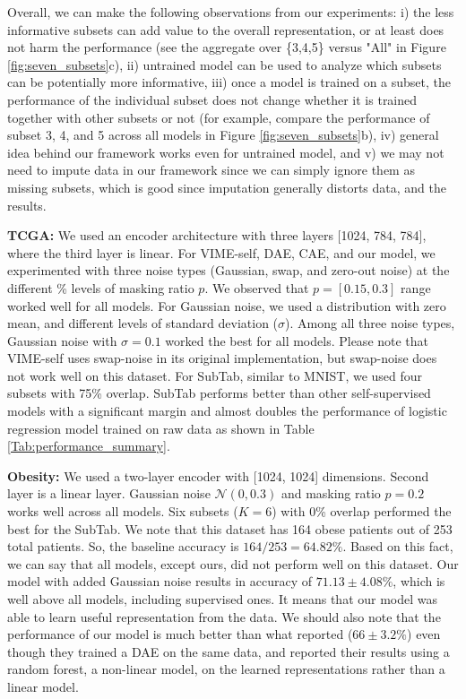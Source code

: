 Overall, we can make the following observations from our experiments: i) the less informative subsets can add value to the overall representation, or at least does not harm the performance (see the aggregate over \{3,4,5\} versus "All" in Figure  \ref{fig:seven_subsets}c), ii) untrained model can be used to analyze which subsets can be potentially more informative, iii) once a model is trained on a subset, the performance of the individual subset does not change whether it is trained together with other subsets or not (for example, compare the performance of subset 3, 4, and 5 across all models in Figure \ref{fig:seven_subsets}b), iv) general idea behind our framework works even for untrained model, and v) we may not need to impute data in our framework since we can simply ignore them as missing subsets, which is good since imputation generally distorts data, and the results.

\textbf{TCGA:}
We used an encoder architecture with three layers [1024, 784, 784], where the third layer is linear. For VIME-self, DAE, CAE, and our model, we experimented with three noise types (Gaussian, swap, and zero-out noise) at the different \% levels of masking ratio $p$. We observed that $p=[0.15,0.3]$ range worked well for all models. For Gaussian noise, we used a distribution with zero mean, and different levels of standard deviation ($\sigma$). Among all three noise types, Gaussian noise with $\sigma=0.1$ worked the best for all models. Please note that VIME-self uses swap-noise in its original implementation, but swap-noise does not work well on this dataset. For SubTab, similar to MNIST, we used four subsets with 75\% overlap. SubTab performs better than other self-supervised models with a significant margin and almost doubles the performance of logistic regression model trained on raw data as shown in Table \ref{Tab:performance_summary}.

\textbf{Obesity:}
We used a two-layer encoder with [1024, 1024] dimensions. Second layer is a linear layer. Gaussian noise $\mathcal{N}(0,0.3)$ and masking ratio $p=0.2$ works well across all models. Six subsets ($K=6$) with 0\% overlap performed the best for the SubTab. We note that this dataset has 164 obese patients out of 253 total patients. So, the baseline accuracy is $164/253=64.82\%$. Based on this fact, we can say that all models, except ours, did not perform well on this dataset. Our model with added Gaussian noise results in accuracy of $71.13\pm4.08\%$, which is well above all models, including supervised ones. It means that our model was able to learn useful representation from the data. We should also note that the performance of our model is much better than what \citet{oh2020deepmicro} reported ($66\pm3.2\%$) even though they trained a DAE on the same data, and reported their results using a random forest, a non-linear model, on the learned representations rather than a linear model. 

